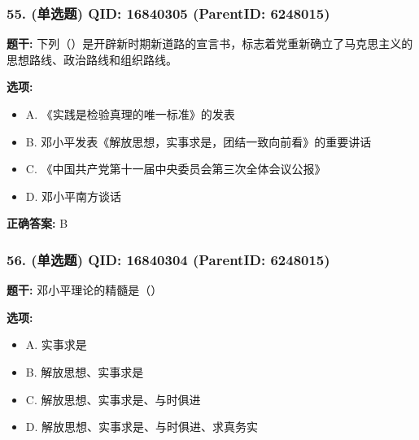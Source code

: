 \documentclass[12pt,UTF8]{ctexart}
\begin{document}
\vspace{0.3em}\hrulefill\vspace{0.7em}

\subsubsection*{55. (单选题) \small QID: 16840305 (ParentID: 6248015)}

\textbf{题干:}
下列（）是开辟新时期新道路的宣言书，标志着党重新确立了马克思主义的思想路线、政治路线和组织路线。



\textbf{选项:}
\begin{itemize}[leftmargin=*]

  \item A. 《实践是检验真理的唯一标准》的发表

  \item B. 邓小平发表《解放思想，实事求是，团结一致向前看》的重要讲话

  \item C. 《中国共产党第十一届中央委员会第三次全体会议公报》

  \item D. 邓小平南方谈话

\end{itemize}

\textbf{正确答案:}
B

\vspace{0.3em}\hrulefill\vspace{0.7em}

\subsubsection*{56. (单选题) \small QID: 16840304 (ParentID: 6248015)}

\textbf{题干:}
邓小平理论的精髓是（）



\textbf{选项:}
\begin{itemize}[leftmargin=*]

  \item A. 实事求是

  \item B. 解放思想、实事求是

  \item C. 解放思想、实事求是、与时俱进

  \item D. 解放思想、实事求是、与时俱进、求真务实

\end{itemize}
\end{document}
